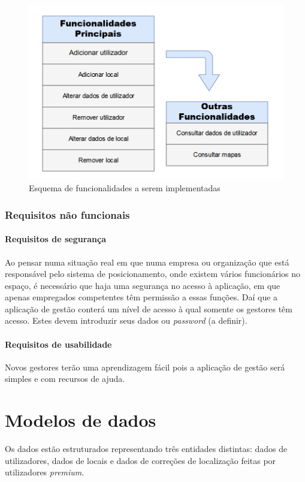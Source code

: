 \documentclass[12pt]{article} %
\begin{document}
\begin{figure}[!htbp]
		\includegraphics[width=12cm]{Funcionalidades.png}
		\centering
		\caption{Esquema de funcionalidades a serem implementadas}

\end{figure}

\pagebreak

\subsubsection{Requisitos não funcionais}


\paragraph{Requisitos de segurança}
Ao pensar numa situação real em que numa empresa ou organização que está responsável pelo sistema de posicionamento, onde existem vários funcionários no espaço, é necessário que haja uma segurança no acesso à aplicação, em que apenas empregados competentes têm permissão a essas funções. Daí que a aplicação de gestão conterá um nível de acesso à qual somente os gestores têm acesso. Estes devem introduzir seus dados ou \textit{password} (a definir).

\paragraph{Requisitos de usabilidade}
Novos gestores terão uma aprendizagem fácil pois a aplicação de gestão será simples e com recursos de ajuda.


\pagebreak

\section{Modelos de dados}
Os dados estão estruturados representando três entidades distintas: dados de utilizadores, dados de locais e dados de correções de localização feitas por utilizadores \textit{premium}.\par
\end{document}
